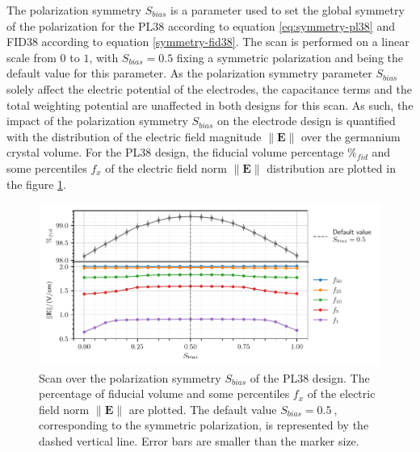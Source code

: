 The polarization symmetry $S_{bias}$ is a parameter used to set the global symmetry of the polarization for the PL38 according to equation \ref{eq:symmetry-pl38} and FID38 according to equation \ref{symmetry-fid38}. The scan is performed on a linear scale from $0$ to $1$, with $S_{bias}=0.5$ fixing a symmetric polarization and being the default value for this parameter. 
As the polarization symmetry parameter $S_{bias}$ solely affect the electric potential of the electrodes, the capacitance terms and the total weighting potential are unaffected in both designs for this scan. As such, the impact of the polarization symmetry $S_{bias}$ on the electrode design is quantified with the distribution of the electric field magnitude $\| \mathbf{E} \|$ over the germanium crystal volume.
For the PL38 design, the fiducial volume percentage $\%_{fid}$ and some percentiles $f_x$ of the electric field norm $\| \mathbf{E} \|$ distribution are plotted in the figure \ref{fig:capacitance-fiducial-V-symmetry-pl38}.

\begin{figure}
\centering
\includegraphics[scale=1]{Figures/ElectrodesScan/capacitance_fiducial_V_symmetry_pl38.pdf}
\caption{Scan over the polarization symmetry $S_{bias}$ of the PL38 design. The percentage of fiducial volume and some percentiles $f_x$ of the electric field norm $\| \mathbf{E} \|$ are plotted. The default value $S_{bias}=\SI{0.5}{}$, corresponding to the symmetric polarization, is represented by the dashed vertical line. Error bars are smaller than the marker size.}
\label{fig:capacitance-fiducial-V-symmetry-pl38}
\end{figure}


